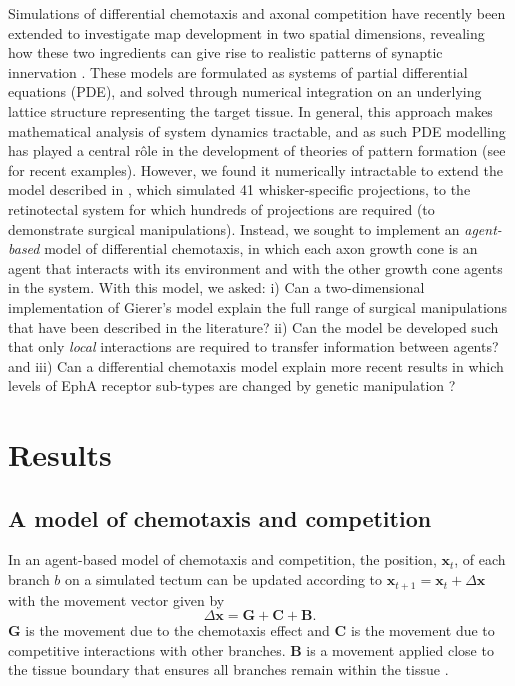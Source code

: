 \documentclass[9pt,lineno]{elife}
\begin{document}
Simulations of differential chemotaxis and axonal competition have recently been extended to investigate map development in two spatial dimensions, revealing how these two ingredients can give rise to realistic patterns of synaptic innervation \citep{james_modelling_2020}. 
These models are formulated as systems of partial differential equations (PDE), and solved through numerical integration on an underlying lattice structure representing the target tissue. 
In general, this approach makes mathematical analysis of system dynamics tractable, and as such PDE modelling has played a central r\^ole in the development of theories of pattern formation (see \citet{krause_modern_2021} for recent examples). 
However, we found it numerically intractable to extend the model described in \citet{james_modelling_2020}, which simulated 41 whisker-specific projections, to the retinotectal system for which hundreds of projections are required (to demonstrate surgical manipulations).
Instead, we sought to implement an \emph{agent-based} model of differential chemotaxis, in which each axon growth cone is an agent that interacts with its environment and with the other growth cone agents in the system.
With this model, we asked: i) Can a two-dimensional implementation of Gierer's model explain the full range of surgical manipulations that have been described in the literature? ii) Can the model be developed such that only \emph{local} interactions are required to transfer information between agents? and iii) Can a differential chemotaxis model explain more recent results in which levels of EphA receptor sub-types are changed by genetic manipulation \citep{brown_topographic_2000,reber_relative_2004}?

\section{Results}
\subsection*{A model of chemotaxis and competition}

In an agent-based model of chemotaxis and competition, the position, $\mathbf{x}_t$, of each branch $b$ on a simulated tectum can be updated according to $\mathbf{x}_{t+1} = \mathbf{x}_{t} + \Delta \mathbf{x}$ with the movement vector given by
\begin{equation} \label{e:dX}
 \Delta \mathbf{x} = \mathbf{G} +  \mathbf{C} + \mathbf{B}.
\end{equation}
$\mathbf{G}$ is the movement due to the chemotaxis effect and $\mathbf{C}$ is the movement due to competitive interactions with other branches. 
$\mathbf{B}$ is a movement applied close to the tissue boundary that ensures all branches remain within the tissue \citep{holt_target_1998}.
\end{document}
